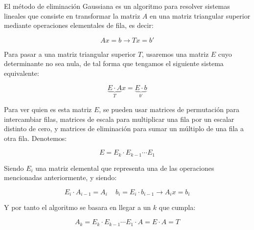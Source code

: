 \begin{proposición}
    El método de eliminación Gaussiana es un algoritmo para resolver sistemas lineales que consiste en transformar la matriz $A$ en una matriz triangular superior mediante operaciones elementales de fila, es decir:

    \[
    Ax = b \longrightarrow
    Tx = b'
    \]

    Para pasar a una matriz triangular superior $T$, usaremos una matriz $E$ cuyo determinante no sea nula, de tal forma que tengamos el siguiente sistema equivalente:

    \[
    \underbrace{E \cdot A}_{T} x = \underbrace{E \cdot b}_{b'}
    \]
    
    Para ver quien es esta matriz $E$, se pueden usar matrices de permutación para intercambiar filas, matrices de escala para multiplicar una fila por un escalar distinto de cero, y matrices de eliminación para sumar un múltiplo de una fila a otra fila. Denotemos:

    \[
    E = E_k \cdot E_{k-1} \cdots E_1
    \]

    Siendo $E_i$ una matriz elemental que representa una de las operaciones mencionadas anteriormente, y siendo:

    \[
        E_i \cdot A_{i-1} = A_i \, \quad b_i = E_i \cdot b_{i-1} \longrightarrow
        A_i x = b_i
    \]

    Y por tanto el algoritmo se basara en llegar a un $k$ que cumpla:

    \[
        A_k = E_k \cdot E_{k-1} \cdots E_1 \cdot A = E \cdot A = T
    \]


\end{proposición}
